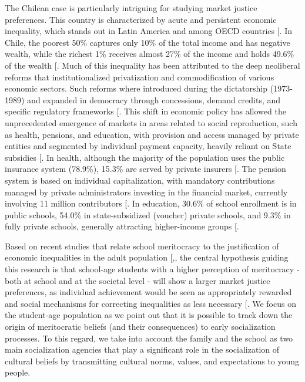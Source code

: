 \documentclass[
  12pt,
  letterpaper,
]{article}
\begin{document}
The Chilean case is particularly intriguing for studying market justice
preferences. This country is characterized by acute and persistent
economic inequality, which stands out in Latin America and among OECD
countries {[}\citeproc{ref-flores_top_2020}{15}{]}. In Chile, the
poorest 50\% captures only 10\% of the total income and has negative
wealth, while the richest 1\% receives almost 27\% of the income and
holds 49.6\% of the wealth {[}\citeproc{ref-chancel_world_2022}{16}{]}.
Much of this inequality has been attributed to the deep neoliberal
reforms that institutionalized privatization and commodification of
various economic sectors. Such reforms where introduced during the
dictatorship (1973-1989) and expanded in democracy through concessions,
demand credits, and specific regulatory frameworks
{[}\citeproc{ref-ffrench-davis_reformas_2018}{17}{]}. This shift in
economic policy has allowed the unprecedented emergence of markets in
areas related to social reproduction, such as health, pensions, and
education, with provision and access managed by private entities and
segmented by individual payment capacity, heavily reliant on State
subsidies {[}\citeproc{ref-boccardo_30_2020}{18}{]}. In health, although
the majority of the population uses the public insurance system
(78.9\%), 15.3\% are served by private insurers
{[}\citeproc{ref-observatoriosocial_estadisticas_2024}{19}{]}. The
pension system is based on individual capitalization, with mandatory
contributions managed by private administrators investing in the
financial market, currently involving 11 million contributors
{[}\citeproc{ref-superintendenciadepensiones_estadisticas_2024}{20}{]}.
In education, 30.6\% of school enrollment is in public schools, 54.0\%
in state-subsidized (voucher) private schools, and 9.3\% in fully
private schools, generally attracting higher-income groups
{[}\citeproc{ref-ministeriodeeducacion_resumen_2023}{21}{]}.

Based on recent studies that relate school meritocracy to the
justification of economic inequalities in the adult population
{[},\citeproc{ref-wiederkehr_belief_2015}{4}{]},
the central hypothesis guiding this research is that school-age students
with a higher perception of meritocracy - both at school and at the
societal level - will show a larger market justice preferences, as
individual achievement would be seen as appropriately rewarded and
social mechanisms for correcting inequalities as less necessary
{[}\citeproc{ref-batruch_belief_2022}{3}{]}. We focus on the student-age
population as we point out that it is possible to track down the origin
of meritocratic beliefs (and their consequences) to early socialization
processes. To this regard, we take into account the family and the
school as two main socialization agencies that play a significant role
in the socialization of cultural beliefs by transmitting cultural norms,
values, and expectations to young people.
\end{document}
